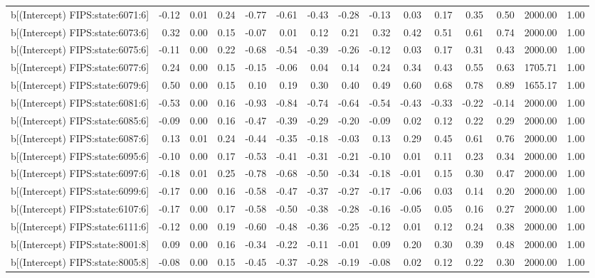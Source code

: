 \begin{table}[ht]
\begin{tabular}{rrrrrrrrrrrrrrr}
  b[(Intercept) FIPS:state:6071:6] & -0.12 & 0.01 & 0.24 & -0.77 & -0.61 & -0.43 & -0.28 & -0.13 & 0.03 & 0.17 & 0.35 & 0.50 & 2000.00 & 1.00 \\ 
  b[(Intercept) FIPS:state:6073:6] & 0.32 & 0.00 & 0.15 & -0.07 & 0.01 & 0.12 & 0.21 & 0.32 & 0.42 & 0.51 & 0.61 & 0.74 & 2000.00 & 1.00 \\ 
  b[(Intercept) FIPS:state:6075:6] & -0.11 & 0.00 & 0.22 & -0.68 & -0.54 & -0.39 & -0.26 & -0.12 & 0.03 & 0.17 & 0.31 & 0.43 & 2000.00 & 1.00 \\ 
  b[(Intercept) FIPS:state:6077:6] & 0.24 & 0.00 & 0.15 & -0.15 & -0.06 & 0.04 & 0.14 & 0.24 & 0.34 & 0.43 & 0.55 & 0.63 & 1705.71 & 1.00 \\ 
  b[(Intercept) FIPS:state:6079:6] & 0.50 & 0.00 & 0.15 & 0.10 & 0.19 & 0.30 & 0.40 & 0.49 & 0.60 & 0.68 & 0.78 & 0.89 & 1655.17 & 1.00 \\ 
  b[(Intercept) FIPS:state:6081:6] & -0.53 & 0.00 & 0.16 & -0.93 & -0.84 & -0.74 & -0.64 & -0.54 & -0.43 & -0.33 & -0.22 & -0.14 & 2000.00 & 1.00 \\ 
  b[(Intercept) FIPS:state:6085:6] & -0.09 & 0.00 & 0.16 & -0.47 & -0.39 & -0.29 & -0.20 & -0.09 & 0.02 & 0.12 & 0.22 & 0.29 & 2000.00 & 1.00 \\ 
  b[(Intercept) FIPS:state:6087:6] & 0.13 & 0.01 & 0.24 & -0.44 & -0.35 & -0.18 & -0.03 & 0.13 & 0.29 & 0.45 & 0.61 & 0.76 & 2000.00 & 1.00 \\ 
  b[(Intercept) FIPS:state:6095:6] & -0.10 & 0.00 & 0.17 & -0.53 & -0.41 & -0.31 & -0.21 & -0.10 & 0.01 & 0.11 & 0.23 & 0.34 & 2000.00 & 1.00 \\ 
  b[(Intercept) FIPS:state:6097:6] & -0.18 & 0.01 & 0.25 & -0.78 & -0.68 & -0.50 & -0.34 & -0.18 & -0.01 & 0.15 & 0.30 & 0.47 & 2000.00 & 1.00 \\ 
  b[(Intercept) FIPS:state:6099:6] & -0.17 & 0.00 & 0.16 & -0.58 & -0.47 & -0.37 & -0.27 & -0.17 & -0.06 & 0.03 & 0.14 & 0.20 & 2000.00 & 1.00 \\ 
  b[(Intercept) FIPS:state:6107:6] & -0.17 & 0.00 & 0.17 & -0.58 & -0.50 & -0.38 & -0.28 & -0.16 & -0.05 & 0.05 & 0.16 & 0.27 & 2000.00 & 1.00 \\ 
  b[(Intercept) FIPS:state:6111:6] & -0.12 & 0.00 & 0.19 & -0.60 & -0.48 & -0.36 & -0.25 & -0.12 & 0.01 & 0.12 & 0.24 & 0.38 & 2000.00 & 1.00 \\ 
  b[(Intercept) FIPS:state:8001:8] & 0.09 & 0.00 & 0.16 & -0.34 & -0.22 & -0.11 & -0.01 & 0.09 & 0.20 & 0.30 & 0.39 & 0.48 & 2000.00 & 1.00 \\ 
  b[(Intercept) FIPS:state:8005:8] & -0.08 & 0.00 & 0.15 & -0.45 & -0.37 & -0.28 & -0.19 & -0.08 & 0.02 & 0.12 & 0.22 & 0.30 & 2000.00 & 1.00 \\ 

\end{tabular}
\end{table}
